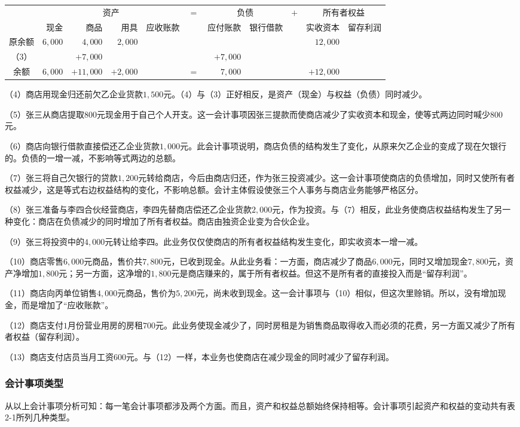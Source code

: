 		\begin{table}[!ht]
			\small
			\centering
			\begin{tabular}{c*{10}{r}}
							 & \multicolumn{4}{c}{资产}& \multirow{2}{*}{$=$} & \multicolumn{2}{c}{负债} & \multirow{2}{*}{$+$} & \multicolumn{2}{c}{所有者权益} \\
				\cline{2-5} \cline{7-8} \cline{10-11}
							 & 现金 & 商品 & 用具 & 应收账款 & & 应付账款 & 银行借款 & & 实收资本 & 留存利润 \\ 
				原余额 & $6,000$ & $4,000$  & $2,000$ & \multicolumn{5}{c}{} & $12,000$  \\
				（3）  &         & $+7,000$ & \multicolumn{3}{c}{} & $+7,000$  \\
				\cline{2-5} \cline{7-8} \cline{10-11}
				余额   & $6,000$ & $+11,000$ & $+2,000$ & & $=$ & $7,000$ & \multicolumn{2}{c}{} & $+12,000$   \\
			\end{tabular}
		\end{table}

		（4）商店用现金归还前欠乙企业货款$1,500$元。（4）与（3）正好相反，是资产（现金）与权益（负债）同时减少。

		（5）张三从商店提取$800$元现金用于自己个人开支。这一会计事项因张三提款而使商店减少了实收资本和现金，使等式两边同时喊少$800$元。

		（6）商店向银行借款直接偿还乙企业货款$1,000$元。此会计事项说明，商店负债的结构发生了变化，从原来欠乙企业的变成了现在欠银行的。负债的一增一减，不影响等式两边的总额。

		（7）张三将自己欠银行的贷款$1,200$元转给商店，今后由商店归还，作为张三投资减少。这一会计事项使商店的负债增加，同时又使所有者权益减少，这是等式右边权益结构的变化，不影响总额。会计主体假设使张三个人事务与商店业务能够严格区分。

		（8）张三准备与李四合伙经营商店，李四先替商店偿还乙企业货款$2,000$元，作为投资。与（7）相反，此业务使商店权益结构发生了另一种变化：商店在负债减少的同时增加了所有者权益。商店由独资企业变为合伙企业。

		（9）张三将投资中的$4,000$元转让给李四。此业务仅仅使商店的所有者权益结构发生变化，即实收资本一增一减。

		（10）商店零售$6,000$元商品，售价共$7,800$元，已收到现金。从此业务看：一方面，商店减少了商品$6,000$元，同时又增加现金$7,800$元，资产净增加$1,800$元；另一方面，这净增的$1,800$元是商店赚来的，属于所有者权益。但这不是所有者的直接投入而是“留存利润”。

		（11）商店向丙单位销售$4,000$元商品，售价为$5,200$元，尚未收到现金。这一会计事项与（10）相似，但这次里赊销。所以，没有增加现金，而是增加了“应收账款”。

		（12）商店支付$1$月份营业用房的房租$700$元。此业务使现金减少了，同时房租是为销售商品取得收入而必须的花费，另一方面又减少了所有者权益（留存利润）。

		（13）商店支付店员当月工资$600$元。与（12）一样，本业务也使商店在减少现金的同时减少了留存利润。

		\subsubsection{会计事项类型}

		从以上会计事项分析可知：每一笔会计事项都涉及两个方面。而且，资产和权益总额始终保持相等。会计事项引起资产和权益的变动共有表2-1所列几种类型。








